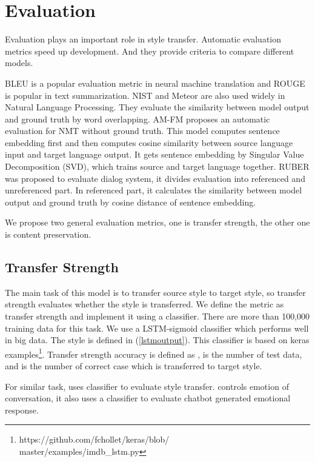\documentclass[letterpaper]{article} \usepackage{aaai18}  \usepackage{times}  \usepackage{helvet}  \usepackage{courier}  \usepackage{url}  \usepackage{graphicx}  \usepackage{amsmath}
\begin{document}
\section{Evaluation}
Evaluation plays an important role in style transfer. 
Automatic evaluation metrics speed up development. 
And they provide criteria to compare different models. 

BLEU \cite{papineni2002bleu} is a popular evaluation metric in neural machine translation 
and ROUGE \cite{lin2004rouge} is popular in text summarization. 
NIST \cite{doddington2000nist} and Meteor \cite{banerjee2005meteor} are also used widely in Natural Language Processing. 
They evaluate the similarity between model output and ground truth by word overlapping. 
AM-FM \cite{banchs2011fm} proposes an automatic evaluation for NMT without ground truth. 
This model computes sentence embedding first and then computes cosine similarity between source language input and target language output.
It gets sentence embedding by Singular Value Decomposition (SVD), which trains source and target language together.
RUBER \cite{tao2017ruber} was proposed to evaluate dialog system, it divides evaluation into referenced and unreferenced part. 
In referenced part, it calculates the similarity between model output and ground truth by cosine distance of sentence embedding.

We propose two general evaluation metrics, one is transfer strength, 
the other one is content preservation.


\subsection{Transfer Strength}
The main task of this model is to transfer source style to target style, 
so transfer strength evaluates whether the style is transferred. 
We define the metric as transfer strength and implement it using a classifier. 
There are more than 100,000 training data for this task. 
We use a LSTM-sigmoid classifier which performs well in big data. 
The style is defined in (\ref{lstmoutput}). 
This classifier is based on keras examples\footnote{https://github.com/fchollet/keras/blob/\\master/examples/imdb\_lstm.py}. 
Transfer strength accuracy is defined as ,  is the number of test data, 
and  is the number of correct case which is transferred to target style.
{\small

}

For similar task, \cite{shen2017style} uses classifier to evaluate style transfer. \cite{zhou2017emotional} controls emotion of conversation, it also uses a classifier to evaluate chatbot generated emotional response.
\end{document}
